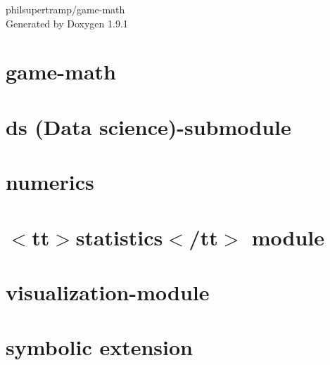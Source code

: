 \let\mypdfximage\pdfximage\def\pdfximage{\immediate\mypdfximage}\documentclass[twoside]{book}
\newcommand{\+}{\discretionary{\mbox{\scriptsize$\hookleftarrow$}}{}{}}
\newcommand{\clearemptydoublepage}{%
  \newpage{\pagestyle{empty}\cleardoublepage}%
}
\begin{document}
\raggedbottom

\hypersetup{pageanchor=false,
             bookmarksnumbered=true,
             pdfencoding=unicode
            }
\begin{titlepage}
\vspace*{7cm}
\begin{center}%
{\Large philsupertramp/game-\/math }\\
\vspace*{1cm}
{\large Generated by Doxygen 1.9.1}\\
\end{center}
\end{titlepage}
\clearemptydoublepage
{}
\tableofcontents
\clearemptydoublepage
{}
\hypersetup{pageanchor=true}

\chapter{game-\/math}
\label{index}\hypertarget{index}{}
\chapter{ds (Data science)-\/submodule}
\label{md_include_math_ds_README}

\chapter{numerics}
\label{md_include_math_numerics_docs_README}

\chapter{$<$tt$>$statistics$<$/tt$>$ module}
\label{md_include_math_statistics_README}

\chapter{visualization-\/module}
\label{md_include_math_visualization_README}

\chapter{symbolic extension}
\label{md_include_math_symb_README}

\end{document}
